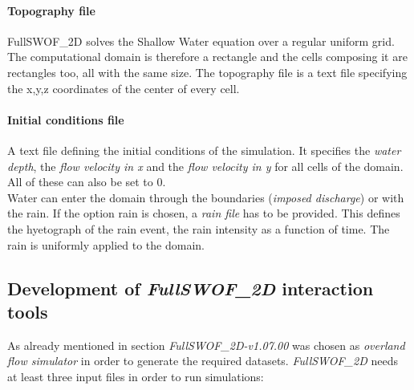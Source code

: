 \paragraph{Topography file} FullSWOF\_2D solves the Shallow Water equation over a regular uniform grid. The computational domain is therefore a rectangle and the cells composing it are rectangles too, all with the same size. The topography file is a text file specifying the x,y,z coordinates of the center of every cell.

\paragraph{Initial conditions file} A text file defining the initial conditions of the simulation. It specifies the \emph{water depth}, the \emph{flow velocity in x} and the \emph{flow velocity in y} for all cells of the domain. All of these can also be set to \num{0}.\\

Water can enter the domain through the boundaries (\emph{imposed discharge}) or with the rain. If the option rain is chosen, a \emph{rain file} has to be provided. This defines the hyetograph of the rain event, the rain intensity as a function of time. The rain is uniformly applied to the domain.


\subsection{Development of \textit{FullSWOF\_2D} interaction tools}
\label{sec:fswof_interaction_tools}



As already mentioned in section  \textit{FullSWOF\_2D-v1.07.00} was chosen as \emph{overland flow simulator} in order to generate the required datasets.
\textit{FullSWOF\_2D} needs at least three input files in order to run simulations:

